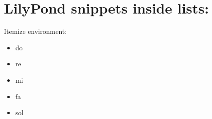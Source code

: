 \documentclass[a4paper, 12pt]{article}
\begin{document}
\section{LilyPond snippets inside lists:}

Itemize environment:
\begin{itemize}
\item
{%
\parindent 0pt
\noindent
\ifx\preLilyPondExample \undefined
\else
  \expandafter\preLilyPondExample
\fi
\def\lilypondbook{}%

\ifx\postLilyPondExample \undefined
\else
  \expandafter\postLilyPondExample
\fi
} do
\item
{%
\parindent 0pt
\noindent
\ifx\preLilyPondExample \undefined
\else
  \expandafter\preLilyPondExample
\fi
\def\lilypondbook{}%

\ifx\postLilyPondExample \undefined
\else
  \expandafter\postLilyPondExample
\fi
} re
\item
{%
\parindent 0pt
\noindent
\ifx\preLilyPondExample \undefined
\else
  \expandafter\preLilyPondExample
\fi
\def\lilypondbook{}%

\ifx\postLilyPondExample \undefined
\else
  \expandafter\postLilyPondExample
\fi
} mi
\item
{%
\parindent 0pt
\noindent
\ifx\preLilyPondExample \undefined
\else
  \expandafter\preLilyPondExample
\fi
\def\lilypondbook{}%

\ifx\postLilyPondExample \undefined
\else
  \expandafter\postLilyPondExample
\fi
} fa
\item
{%
\parindent 0pt
\noindent
\ifx\preLilyPondExample \undefined
\else
  \expandafter\preLilyPondExample
\fi
\def\lilypondbook{}%

\ifx\postLilyPondExample \undefined
\else
  \expandafter\postLilyPondExample
\fi
} sol
\end{itemize}
\end{document}

